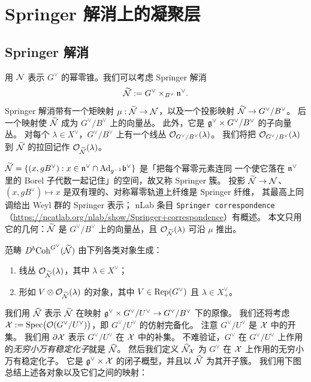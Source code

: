 \section{Springer 解消上的凝聚层}

\subsection{Springer 解消}\label{sec:springer}

用 $\mathcal{N}$ 表示 $G^\vee$ 的幂零锥。我们可以考虑 Springer 解消
\[
\widetilde{\mathcal{N}}:=G^\vee\times_{B^\vee}\mathfrak{n}^\vee .
\]
Springer 解消带有一个矩映射 $\mu:\widetilde{\mathcal{N}}\to\mathcal{N}$，以及一个投影映射 $\widetilde{\mathcal{N}}\to G^\vee/B^\vee$。
后一个映射使 $\widetilde{\mathcal{N}}$ 成为 $G^\vee/B^\vee$ 上的向量丛。
此外，它是 $\mathfrak{g}^\vee\times G^\vee/B^\vee$ 的子向量丛。
对每个 $\lambda\in X^\vee$，$G^\vee/B^\vee$ 上有一个线丛 $\mathcal{O}_{G^\vee/B^\vee}(\lambda)$。
我们将把 $\mathcal{O}_{G^\vee/B^\vee}(\lambda)$ 到 $\widetilde{\mathcal{N}}$ 的拉回记作 $\mathcal{O}_{\widetilde{\mathcal{N}}}(\lambda)$。

\begin{yizhu}
$\widetilde{\mathcal{N}}=\{(x,gB^\vee):x\in\mathfrak{n}^\vee\cap\mathrm{Ad}_{g^{-1}}\mathfrak{b}^\vee\}$ 是「把每个幂零元素连同
一个使它落在 $\mathfrak{n}^\vee$ 里的 Borel 子代数一起记住」的空间，故又称 Springer 簇。
投影 $\widetilde{\mathcal{N}}\to\mathcal{N}$、$(x,gB^\vee)\mapsto x$ 是双有理的、对称幂零轨道上纤维是 Springer 纤维，
其最高上同调给出 Weyl 群的 Springer 表示；
nLab 条目 \texttt{Springer correspondence}
（\url{https://ncatlab.org/nlab/show/Springer+correspondence}）有概述。
本文只用它的几何：$\widetilde{\mathcal{N}}$ 是 $G^\vee/B^\vee$ 上的向量丛，且 $\mathcal{O}_{\widetilde{\mathcal{N}}}(\lambda)$ 可沿 $\mu$ 推出。
\end{yizhu}

\begin{lemma}\label{lem:gen}
范畴 $D^b\mathrm{Coh}^{G^\vee}(\widetilde{\mathcal{N}})$ 由下列各类对象生成：
\begin{enumerate}[label=(\arabic*),leftmargin=2.2em,itemsep=1pt]
\item 线丛 $\mathcal{O}_{\widetilde{\mathcal{N}}}(\lambda)$，其中 $\lambda\in X^\vee$；
\item 形如 $V\otimes\mathcal{O}_{\widetilde{\mathcal{N}}}(\lambda)$ 的对象，其中 $V\in\mathrm{Rep}(G^\vee)$ 且 $\lambda\in X^\vee_+$。
\end{enumerate}
\end{lemma}

我们用 $\widehat{\mathcal{N}}$ 表示 $\widetilde{\mathcal{N}}$ 在映射 $\mathfrak{g}^\vee\times G^\vee/U^\vee\to G^\vee/B^\vee$ 下的原像。
我们还将考虑 $\mathcal{X}:=\mathrm{Spec}\bigl(\mathcal{O}(G^\vee/U^\vee)\bigr)$，即 $G^\vee/U^\vee$ 的仿射完备化。
注意 $G^\vee/U^\vee$ 是 $\mathcal{X}$ 中的开集。
我们用 $\partial\mathcal{X}$ 表示 $G^\vee/U^\vee$ 在 $\mathcal{X}$ 中的补集。
不难验证，$G^\vee$ 在 $G^\vee/U^\vee$ 上作用的\emph{无穷小万有稳定化子}就是 $\widehat{\mathcal{N}}$。
然后我们定义 $\widehat{\mathcal{N}}_{\mathcal{X}}$ 为 $G^\vee$ 在 $\mathcal{X}$ 上作用的无穷小万有稳定化子。
它是 $\mathfrak{g}^\vee\times\mathcal{X}$ 的闭子概型，并且以 $\widehat{\mathcal{N}}$ 为其开子簇。
我们用下图总结上述各对象以及它们之间的映射：

